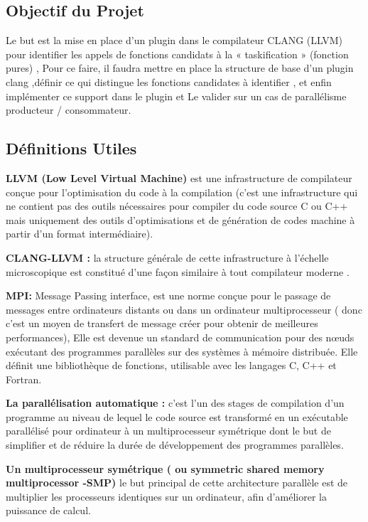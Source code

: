 \documentclass[12pt,titlepage]{article}
\begin{document}
\subsection{Objectif du Projet}

Le but est la mise en place d’un plugin dans le compilateur CLANG (LLVM) pour identifier les appels de fonctions candidats à la « taskification » (fonction pures) , Pour ce faire, il faudra mettre en place la structure de base d’un plugin clang ,définir ce qui distingue les fonctions candidates à identifier , et enfin implémenter ce support dans le plugin et  Le valider sur un cas de parallélisme producteur / consommateur.

\subsection{Définitions Utiles} 
	
\textbf{ LLVM (Low Level Virtual Machine)} est une infrastructure de compilateur conçue pour l'optimisation du code à la compilation (c’est une infrastructure qui ne contient pas des outils nécessaires pour compiler du code source C ou C++ mais uniquement des outils d’optimisations et de génération de codes machine à partir d’un format intermédiaire).\cite{clangllvm}
              
\textbf{CLANG-LLVM :} la structure générale de cette infrastructure à l’échelle microscopique est constitué d’une façon similaire à tout compilateur moderne .\cite{clangllvm}


\textbf{ MPI:} Message Passing interface, est une norme conçue pour le passage de messages entre ordinateurs distants ou dans un ordinateur multiprocesseur ( donc c’est un moyen de transfert de message créer pour obtenir de meilleures performances), Elle est devenue un standard de communication pour des nœuds exécutant des programmes parallèles sur des systèmes à mémoire distribuée. Elle définit une bibliothèque de fonctions, utilisable avec les langages C, C++ et Fortran.\cite{wiki}


\textbf{ La parallélisation automatique :} c’est l’un des stages de compilation d’un programme au niveau de lequel le code source est transformé  en un exécutable parallélisé pour ordinateur à un multiprocesseur symétrique dont le but de simplifier et de réduire la durée de développement des programmes parallèles.\cite{wiki}

\textbf{ Un multiprocesseur symétrique ( ou symmetric shared memory multiprocessor -SMP) } 
le but principal de cette architecture parallèle  est de multiplier les processeurs identiques sur un ordinateur, afin d’améliorer  la puissance de calcul.\cite{wiki}
\end{document}

